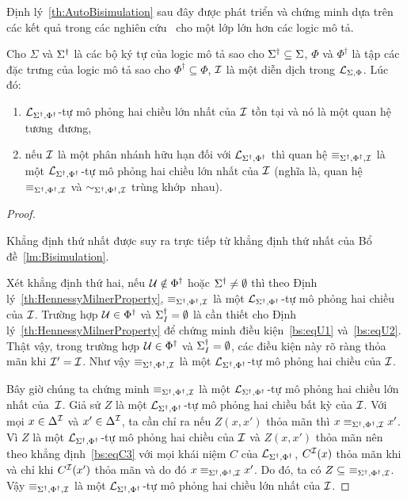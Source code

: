 Định lý~\ref{th:AutoBisimulation} sau đây được phát triển và chứng minh dựa trên các kết quả trong các nghiên cứu~\cite{Divroodi2011B,Nguyen2013} cho một lớp lớn hơn các logic mô tả.

\begin{Theorem} 
\label{th:AutoBisimulation}
	Cho $\Sigma$ và $\Sigma^\dag$ là các bộ ký tự của logic mô tả sao cho $\Sigma^\dag \subseteq \Sigma$, $\Phi$ và $\Phi^\dag$ là tập các đặc trưng của logic mô tả sao cho $\Phi^\dag \subseteq \Phi$, $\mathcal{I}$ là một diễn dịch trong $\mathcal{L}_{\Sigma,\Phi}$. Lúc đó:
	\begin{enumerate}
		\item $\mathcal{L}_{\Sigma^\dag,\Phi^\dag}$-tự mô phỏng hai chiều lớn nhất của $\mathcal{I}$ tồn tại và nó là một quan hệ tương~đương,\label{th:AutoBisimulation-item1}  
		\item nếu $\mathcal{I}$ là một phân nhánh hữu hạn đối với $\mathcal{L}_{\Sigma^\dag,\Phi^\dag}$ thì quan hệ $\equiv_{\Sigma^\dag,\Phi^\dag,\mathcal{I}}$ là một $\mathcal{L}_{\Sigma^\dag,\Phi^\dag}$-tự mô phỏng hai chiều lớn nhất của $\mathcal{I}$ (nghĩa là, quan hệ $\equiv_{\Sigma^\dag,\Phi^\dag,\mathcal{I}}$ và $\sim_{\Sigma^\dag,\Phi^\dag,\mathcal{I}}$ trùng khớp~nhau).\label{th:AutoBisimulation-item2}\myend
	\end{enumerate}
\end{Theorem}

\begin{proof}~

\semiItem Khẳng định thứ nhất được suy ra trực tiếp từ khẳng định thứ nhất của Bổ đề~\ref{lm:Bisimulation}.

\semiItem Xét khẳng định thứ hai, nếu $\mathcal{U} \notin \Phi^\dag$ hoặc $\Sigma^\dag \not= \emptyset$ thì theo Định lý~\ref{th:HennessyMilnerProperty}, $\equiv_{\Sigma^\dag,\Phi^\dag,\mathcal{I}}$ là một $\mathcal{L}_{\Sigma^\dag,\Phi^\dag}$-tự mô phỏng hai chiều của $\mathcal{I}$.
Trường hợp $\mathcal{U} \in \Phi^\dag$ và $\Sigma^\dag_I = \emptyset$
là cần thiết cho Định lý~\ref{th:HennessyMilnerProperty} để chứng minh điều kiện~\eqref{bs:eqU1} và~\eqref{bs:eqU2}. Thật vậy, trong trường hợp $\mathcal{U} \in \Phi^\dag$ và $\Sigma^\dag_I = \emptyset$, các điều kiện này rõ ràng thỏa mãn khi $\mathcal{I}' = \mathcal{I}$. Như vậy $\equiv_{\Sigma^\dag,\Phi^\dag,\mathcal{I}}$ là một $\mathcal{L}_{\Sigma^\dag,\Phi^\dag}$-tự mô phỏng hai chiều của $\mathcal{I}$.

Bây giờ chúng ta chứng minh $\equiv_{\Sigma^\dag,\Phi^\dag,\mathcal{I}}$ là một $\mathcal{L}_{\Sigma^\dag,\Phi^\dag}$-tự mô phỏng hai chiều lớn nhất của~$\mathcal{I}$. Giả sử $Z$ là một $\mathcal{L}_{\Sigma^\dag,\Phi^\dag}$-tự mô phỏng hai chiều bất kỳ của $\mathcal{I}$. Với mọi $x \in \Delta^{\mathcal{I}}$ và $x' \in \Delta^{\mathcal{I}}$, ta cần chỉ ra nếu $Z(x,x')$ thỏa mãn thì $x \equiv_{\Sigma^\dag,\Phi^\dag,\mathcal{I}} x'$. Vì $Z$ là một $\mathcal{L}_{\Sigma^\dag,\Phi^\dag}$-tự mô phỏng hai chiều của $\mathcal{I}$ và $Z(x,x')$ thỏa mãn nên theo khẳng định~\eqref{bs:eqC3} với mọi khái niệm $C$ của $\mathcal{L}_{\Sigma^\dag,\Phi^\dag}$, $C^{\mathcal{I}}(x)$ thỏa mãn khi và chỉ khi $C^{\mathcal{I}}(x')$ thỏa mãn và do đó $x \equiv_{\Sigma^\dag,\Phi^\dag,\mathcal{I}} x'$. Do đó, ta có $Z \subseteq\ \equiv_{\Sigma^\dag,\Phi^\dag,\mathcal{I}}$. Vậy $\equiv_{\Sigma^\dag,\Phi^\dag,\mathcal{I}}$ là một $\mathcal{L}_{\Sigma^\dag,\Phi^\dag}$-tự mô phỏng hai chiều lớn nhất của $\mathcal{I}$.
\end{proof}

